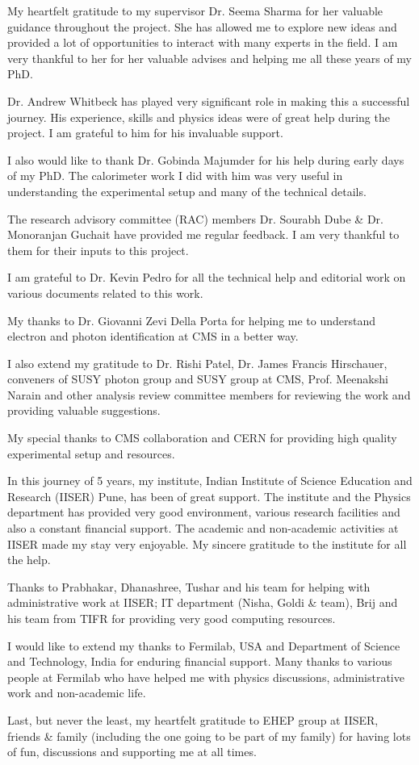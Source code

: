 \documentclass[
11pt, %
english, %
singlespacing, %
headsepline, %
]{MastersDoctoralThesis} %
\begin{document}
\begin{acknowledgements}
\addchaptertocentry{\acknowledgementname} %
My heartfelt gratitude to my supervisor Dr. Seema Sharma for her valuable guidance throughout the project.
She has allowed me to explore new ideas and provided a lot of opportunities to interact with many experts in the field.
I am very thankful to her for her valuable advises and helping me all these years of my PhD.

Dr. Andrew Whitbeck has played very significant role in making this a successful journey.
His experience, skills and physics ideas were of great help during the project. I am grateful to him for his invaluable support.

I also would like to thank Dr. Gobinda Majumder for his help during early days of my PhD.
The calorimeter work I did with him was very useful in understanding the experimental setup and many of the technical details.

The research advisory committee (RAC) members Dr. Sourabh Dube \& Dr. Monoranjan Guchait have provided me regular feedback.
I am very thankful to them for their inputs to this project.

I am grateful to Dr. Kevin Pedro for all the technical help and editorial work on various documents related to this work.

My thanks to Dr. Giovanni Zevi Della Porta for helping me to understand electron and photon identification at CMS in a better way.

I also extend my gratitude to Dr. Rishi Patel, Dr. James Francis Hirschauer, conveners of SUSY photon group and SUSY group at
CMS, Prof. Meenakshi Narain and other analysis review committee members for reviewing the work and providing valuable suggestions.

My special thanks to CMS collaboration and CERN for providing high quality experimental setup and resources.

In this journey of 5 years, my institute, Indian Institute of Science Education and Research (IISER) Pune, has been of great support.
The institute and the Physics department has provided very good environment, various research facilities and also a constant financial 
support. The academic and non-academic activities at IISER made my stay very enjoyable. My sincere gratitude to the institute for all the help.

Thanks to Prabhakar, Dhanashree, Tushar and his team for helping with administrative work at IISER; IT department (Nisha, Goldi \& team), Brij and his team from TIFR for providing very good computing resources.

I would like to extend my thanks to Fermilab, USA and Department of Science and Technology, India for enduring financial support. Many 
thanks to various people at Fermilab who have helped me with physics discussions, administrative work and non-academic life.

Last, but never the least, my heartfelt gratitude to EHEP group at IISER, friends \& family (including the one going to be part of my 
family) for having lots of fun, discussions and 
supporting me at all times.
\end{acknowledgements}
\end{document}
